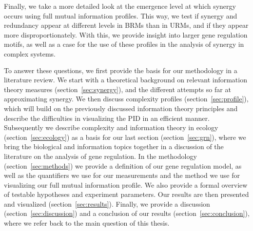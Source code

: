 \documentclass[../main.tex]{subfiles}
\begin{document}
Finally, we take a more detailed look at the emergence level at which synergy occurs using full mutual information profiles.
This way, we test if synergy and redundancy appear at different levels in BRMs than in URMs, and if they appear more disproportionately.
With this, we provide insight into larger gene regulation motifs, as well as a case for the use of these profiles in the analysis of synergy in complex systems.

To answer these questions, we first provide the basis for our methodology in a literature review.
We start with a theoretical background on relevant information theory measures (section~\ref{sec:synergy}), and the different attempts so far at approximating synergy.
We then discuss complexity profiles (section~\ref{sec:profile}), which will build on the previously discussed information theory principles and describe the difficulties in visualizing the PID in an efficient manner.
Subsequently we describe complexity and information theory in ecology (section~\ref{sec:ecology}) as a basis for our last section (section~\ref{sec:grn}), where we bring the biological and information topics together in a discussion of the literature on the analysis of gene regulation.
In the methodology (section~\ref{sec:methods}) we provide a definition of our gene regulation model, as well as the quantifiers we use for our measurements and the method we use for visualizing our full mutual information profile.
We also provide a formal overview of testable hypotheses and experiment parameters.
Our results are then presented and visualized (section~\ref{sec:results}).
Finally, we provide a discussion (section~\ref{sec:discussion}) and a conclusion of our results (section~\ref{sec:conclusion}), where we refer back to the main question of this thesis.
\end{document}
